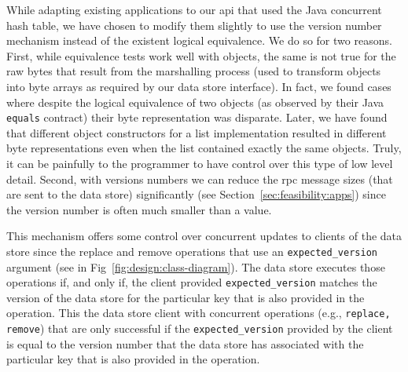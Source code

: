 While adapting existing applications to our \gls{api} that used the Java concurrent hash table, we have chosen to modify them slightly to use the version number mechanism instead of the existent logical equivalence. We do so for two reasons. First, while equivalence tests work well with objects, the same is not true for the raw bytes that result from the marshalling process (used to transform objects into byte arrays as required by our data store interface). In fact, we found cases where despite the  logical equivalence of two objects (as observed by their Java \texttt{equals} contract) their byte representation was disparate. Later, we have found that different object constructors for a list implementation resulted in different byte representations even when the list contained exactly the same objects. Truly, it can be painfully to the programmer to have control over this type of low level detail. Second, with versions numbers we can  reduce the \gls{rpc} message sizes (that are sent to the data store) significantly (see Section~\ref{sec:feasibility:apps}) since the version number is often much smaller than a value. 

This mechanism offers some control over concurrent updates to clients of the data store since the replace and remove operations that use an \texttt{expected\_version} argument (see in Fig~\ref{fig:design:class-diagram}). The data store executes those operations if, and only if, the client provided \texttt{expected\_version} matches the version of the data store for the particular key that is also provided in the operation.  
This the data store client with concurrent operations (e.g., \texttt{replace, remove}) that are only successful if the \texttt{expected\_version} provided by the client is equal to the version number that the data store has associated with the particular key that is also provided in the operation. 

